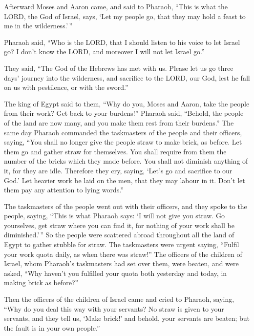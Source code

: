  Afterward Moses and Aaron came, and said to Pharaoh,
``This is what the LORD, the God of Israel, says, `Let my people go,
that they may hold a feast to me in the wilderness.'\,''

 Pharaoh said, ``Who is the LORD, that I should listen to
his voice to let Israel go? I don't know the LORD, and moreover I will
not let Israel go.''

 They said, ``The God of the Hebrews has met with us.
Please let us go three days' journey into the wilderness, and sacrifice
to the LORD, our God, lest he fall on us with pestilence, or with the
sword.''

 The king of Egypt said to them, ``Why do you, Moses and
Aaron, take the people from their work? Get back to your burdens!''
 Pharaoh said, ``Behold, the people of the land are now
many, and you make them rest from their burdens.''  The
same day Pharaoh commanded the taskmasters of the people and their
officers, saying,  ``You shall no longer give the people
straw to make brick, as before. Let them go and gather straw for
themselves.  You shall require from them the number of the
bricks which they made before. You shall not diminish anything of it,
for they are idle. Therefore they cry, saying, `Let's go and sacrifice
to our God.'  Let heavier work be laid on the men, that
they may labour in it. Don't let them pay any attention to lying
words.''

 The taskmasters of the people went out with their
officers, and they spoke to the people, saying, ``This is what Pharaoh
says: `I will not give you straw.  Go yourselves, get
straw where you can find it, for nothing of your work shall be
diminished.'\,''  So the people were scattered abroad
throughout all the land of Egypt to gather stubble for straw.
 The taskmasters were urgent saying, ``Fulfil your work
quota daily, as when there was straw!''  The officers of
the children of Israel, whom Pharaoh's taskmasters had set over them,
were beaten, and were asked, ``Why haven't you fulfilled your quota both
yesterday and today, in making brick as before?''

 Then the officers of the children of Israel came and
cried to Pharaoh, saying, ``Why do you deal this way with your servants?
 No straw is given to your servants, and they tell us,
`Make brick!' and behold, your servants are beaten; but the fault is in
your own people.''


